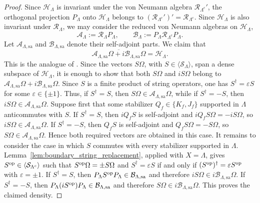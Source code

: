 \documentclass[a4paper,11pt]{article}
\theoremstyle{definition}
\theoremstyle{remark}
\theoremstyle{remark}
\begin{document}
\begin{proof}
Since $\mathcal H_\Lambda$ is invariant under the von Neumann algebra $\mathcal R_{\Lambda^c}'$, the orthogonal projection $P_\Lambda$ onto $\mathcal H_\Lambda$ belongs to $(\mathcal R_{\Lambda^c}')'=\mathcal R_{\Lambda^c}$. Since $\mathcal H_\Lambda$ is also invariant under $\mathcal R_\Lambda$, we may consider the reduced von Neumann algebras on $\mathcal H_\Lambda$,
\[
    \mathcal A_\Lambda:=\mathcal R_\Lambda P_\Lambda,\qquad \mathcal B_\Lambda:=P_\Lambda\mathcal R_{\Lambda^c}P_\Lambda.
\]
Let $\mathcal A_{\Lambda,\mathrm{sa}}$ and $\mathcal B_{\Lambda,\mathrm{sa}}$ denote their self-adjoint parts. We claim that
\[
    \overline{\mathcal A_{\Lambda,\mathrm{sa}}\Omega+i\mathcal B_{\Lambda,\mathrm{sa}}\Omega}=\mathcal H_\Lambda.
\]
This is the analogue of \cite[Lemma~3.8]{naaijkens2012haag}. Since the vectors $S\Omega$, with $S\in\langle\mathcal S_\Lambda\rangle$, span a dense subspace of $\mathcal H_\Lambda$, it is enough to show that both $S\Omega$ and $iS\Omega$ belong to $\mathcal A_{\Lambda,\mathrm{sa}}\Omega+i\mathcal B_{\Lambda,\mathrm{sa}}\Omega$. Since $S$ is a finite product of string operators, one has $S^\dagger=\varepsilon S$ for some $\varepsilon\in\{\pm1\}$. Thus, if $S^\dagger=S$, then $S\Omega\in\mathcal A_{\Lambda,\mathrm{sa}}\Omega$, while if $S^\dagger=-S$, then $iS\Omega\in\mathcal A_{\Lambda,\mathrm{sa}}\Omega$.
Suppose first that some stabilizer $Q_f\in\{K_f,J_f\}$ supported in $\Lambda$ anticommutes with $S$. If $S^\dagger=S$, then $iQ_fS$ is self-adjoint and $iQ_fS\Omega=-iS\Omega$, so $iS\Omega\in\mathcal A_{\Lambda,\mathrm{sa}}\Omega$. If $S^\dagger=-S$, then $Q_fS$ is self-adjoint and $Q_fS\Omega=-S\Omega$, so $S\Omega\in\mathcal A_{\Lambda,\mathrm{sa}}\Omega$. Hence both required vectors are obtained in this case.
It remains to consider the case in which $S$ commutes with every stabilizer supported in $\Lambda$. Lemma~\ref{lem:boundary_string_replacement}, applied with $X=\Lambda$, gives $S^{\rm op}\in\langle\mathcal S_{\Lambda^c}\rangle$ such that $S^{\rm op}\Omega=\pm S\Omega$ and $S^\dagger=\varepsilon S$ if and only if $(S^{\rm op})^\dagger=\varepsilon S^{\rm op}$ with $\varepsilon =\pm 1$. If $S^\dagger=S$, then $P_\Lambda S^{\rm op}P_\Lambda\in\mathcal B_{\Lambda,\mathrm{sa}}$ and therefore $iS\Omega\in i\mathcal B_{\Lambda,\mathrm{sa}}\Omega$. If $S^\dagger=-S$, then $P_\Lambda(iS^{\rm op})P_\Lambda\in\mathcal B_{\Lambda,\mathrm{sa}}$ and therefore $S\Omega\in i\mathcal B_{\Lambda,\mathrm{sa}}\Omega$. This proves the claimed density.


\end{proof}
\end{document}
